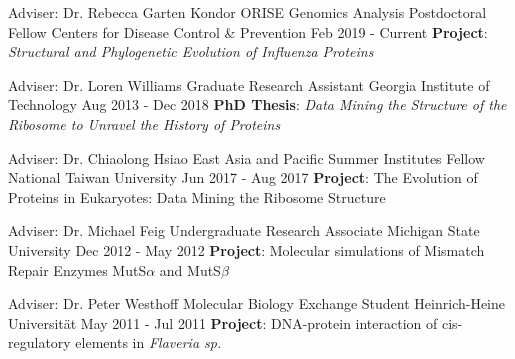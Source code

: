 

\begin{cventries}

  \cventry
    {Adviser: Dr. Rebecca Garten Kondor} %
    {ORISE Genomics Analysis Postdoctoral Fellow} %
    {Centers for Disease Control \& Prevention} %
    {Feb 2019 - Current} %
    {{}\textbf{Project}: \textit{Structural and Phylogenetic Evolution of Influenza Proteins}
    \vspace{2.0mm}}

  \cventry
    {Adviser: Dr. Loren Williams} %
    {Graduate Research Assistant} %
    {Georgia Institute of Technology} %
    {Aug 2013 - Dec 2018} %
    {{}\textbf{PhD Thesis}: \textit{Data Mining the Structure of the Ribosome to Unravel the History of Proteins}
    \vspace{2.0mm}}
    
  \cventry
    {Adviser: Dr. Chiaolong Hsiao} %
    {East Asia and Pacific Summer Institutes Fellow} %
    {National Taiwan University} %
    {Jun 2017 - Aug 2017} %
    {{}{\textbf{Project}: The Evolution of Proteins in Eukaryotes: Data Mining the Ribosome Structure}
    \vspace{2.0mm}}
    
  \cventry
    {Adviser: Dr. Michael Feig} %
    {Undergraduate Research Associate} %
    {Michigan State University} %
    {Dec 2012 - May 2012} %
    {{}{\textbf{Project}: Molecular simulations of Mismatch Repair Enzymes MutS$\alpha$ and MutS$\beta$}
    \vspace{2.0mm}}

  \cventry
    {Adviser: Dr. Peter Westhoff} %
    {Molecular Biology Exchange Student} %
    {Heinrich-Heine Universit{\"a}t} %
    {May 2011 - Jul 2011} %
    {{}{\textbf{Project}: DNA-protein interaction of cis-regulatory elements in \textit{Flaveria sp.}}
    \vspace{2.0mm}}
    

\end{cventries}
